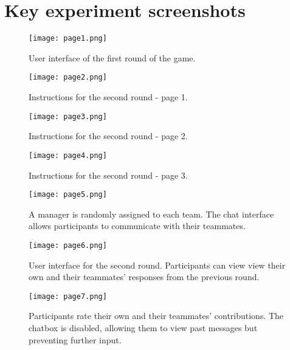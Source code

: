 \clearpage

\section*{Key experiment screenshots}

\begin{figure}[htbp] 
    \centering
    \texttt{[image: page1.png]} 
    \caption{User interface of the first round of the game. } 
    \label{fig:page1} 
\end{figure} 

\begin{figure}[htbp] 
    \centering
    \texttt{[image: page2.png]} 
    \caption{Instructions for the second round - page 1.} 
    \label{fig:page2} 
\end{figure} 

\begin{figure}[htbp] 
    \centering
    \texttt{[image: page3.png]} 
    \caption{Instructions for the second round - page 2.} 
    \label{fig:page3} 
\end{figure} 

\begin{figure}[htbp] 
    \centering
    \texttt{[image: page4.png]} 
    \caption{Instructions for the second round - page 3.} 
    \label{fig:page4} 
\end{figure} 

\begin{figure}[htbp] 
    \centering
    \texttt{[image: page5.png]} 
    \caption{A manager is randomly assigned to each team. The chat interface allows participants to communicate with their teammates.} 
    \label{fig:page5} 
\end{figure} 

\begin{figure}[htbp] 
    \centering
    \texttt{[image: page6.png]} 
    \caption{User interface for the second round. Participants can view
    view their own and their teammates’ responses from the previous round.} 
    \label{fig:page6} 
\end{figure} 

\begin{figure}[htbp] 
    \centering
    \texttt{[image: page7.png]} 
    \caption{Participants rate their own and their teammates’ contributions. The chatbox is disabled, allowing them to view past messages but preventing further input.} 
    \label{fig:page7} 
\end{figure} 

